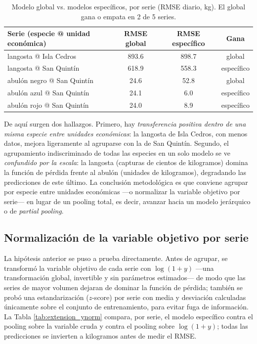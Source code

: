 \begin{table}[htbp]
\centering
\begin{tabular}{lccc}
\toprule
Serie (especie @ unidad económica) & RMSE global & RMSE específico & Gana \\
\midrule
langosta @ Isla Cedros & 893.6 & 898.7 & global \\
langosta @ San Quintín & 618.9 & 558.3 & específico \\
abulón negro @ San Quintín & 24.6 & 52.8 & global \\
abulón azul @ San Quintín & 24.1 & 6.0 & específico \\
abulón rojo @ San Quintín & 24.0 & 8.9 & específico \\
\bottomrule
\end{tabular}
\caption{Modelo global vs. modelos específicos, por serie (RMSE diario, kg). El global gana o empata en 2 de 5 series.}
\label{tab:extension_global}
\end{table}

De aquí surgen dos hallazgos. Primero, hay \emph{transferencia positiva dentro de una misma especie entre unidades económicas}: la langosta de Isla Cedros, con menos datos, mejora ligeramente al agruparse con la de San Quintín. Segundo, el agrupamiento indiscriminado de todas las especies en un solo modelo se ve \emph{confundido por la escala}: la langosta (capturas de cientos de kilogramos) domina la función de pérdida frente al abulón (unidades de kilogramos), degradando las predicciones de este último. La conclusión metodológica es que conviene agrupar por especie entre unidades económicas —o normalizar la variable objetivo por serie— en lugar de un pooling total, es decir, avanzar hacia un modelo jerárquico o de \emph{partial pooling}.

\subsection{Normalización de la variable objetivo por serie}
La hipótesis anterior se puso a prueba directamente. Antes de agrupar, se transformó la variable objetivo de cada serie con $\log(1+y)$ —una transformación global, invertible y sin parámetros estimados— de modo que las series de mayor volumen dejaran de dominar la función de pérdida; también se probó una estandarización ($z$-score) por serie con media y desviación calculadas únicamente sobre el conjunto de entrenamiento, para evitar fuga de información. La Tabla \ref{tab:extension_ynorm} compara, por serie, el modelo específico contra el pooling sobre la variable cruda y contra el pooling sobre $\log(1+y)$; todas las predicciones se invierten a kilogramos antes de medir el RMSE.


